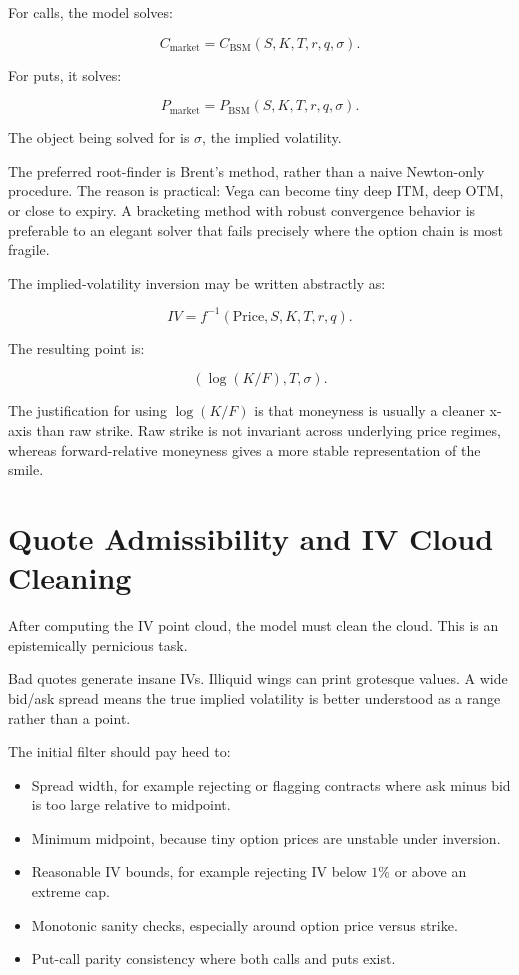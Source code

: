 \documentclass[11pt]{article}
\begin{document}
For calls, the model solves:

\[
C_{\text{market}} = C_{\text{BSM}}(S,K,T,r,q,\sigma).
\]

For puts, it solves:

\[
P_{\text{market}} = P_{\text{BSM}}(S,K,T,r,q,\sigma).
\]

The object being solved for is $\sigma$, the implied volatility.

The preferred root-finder is Brent's method, rather than a naive Newton-only procedure. The reason is practical: Vega can become tiny deep ITM, deep OTM, or close to expiry. A bracketing method with robust convergence behavior is preferable to an elegant solver that fails precisely where the option chain is most fragile.

The implied-volatility inversion may be written abstractly as:

\[
IV =
f^{-1}(\text{Price}, S, K, T, r, q).
\]

The resulting point is:

\[
(\log(K/F), T, \sigma).
\]

The justification for using $\log(K/F)$ is that moneyness is usually a cleaner x-axis than raw strike. Raw strike is not invariant across underlying price regimes, whereas forward-relative moneyness gives a more stable representation of the smile.

\section{Quote Admissibility and IV Cloud Cleaning}

After computing the IV point cloud, the model must clean the cloud. This is an epistemically pernicious task.

Bad quotes generate insane IVs. Illiquid wings can print grotesque values. A wide bid/ask spread means the true implied volatility is better understood as a range rather than a point.

The initial filter should pay heed to:

\begin{itemize}[leftmargin=1.5em]
    \item Spread width, for example rejecting or flagging contracts where ask minus bid is too large relative to midpoint.
    \item Minimum midpoint, because tiny option prices are unstable under inversion.
    \item Reasonable IV bounds, for example rejecting IV below $1\%$ or above an extreme cap.
    \item Monotonic sanity checks, especially around option price versus strike.
    \item Put-call parity consistency where both calls and puts exist.
\end{itemize}
\end{document}
